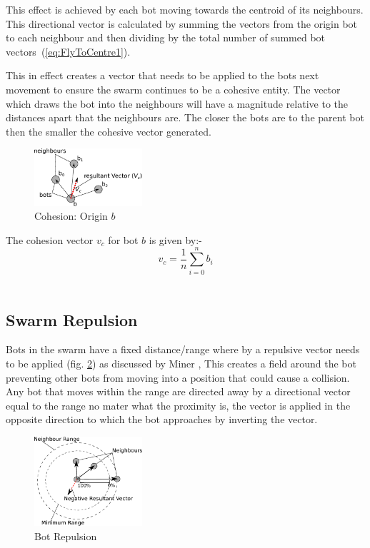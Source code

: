 \documentclass[10pt,journal,letterpaper,twoside]{IEEEtran}
\newcommand{\Fig}{fig.}
\begin{document}
This effect is achieved by each bot moving towards the centroid of its
neighbours. This directional vector is calculated by summing the
vectors from the origin bot to each neighbour and then dividing by the
total number of summed bot vectors~(\ref{eq:FlyToCentre1}).

This in effect creates a vector that needs to be applied to the bots
next movement to ensure the swarm continues to be a cohesive
entity. The vector which draws the bot into the neighbours will have a
magnitude relative to the distances apart that the neighbours are. The
closer the bots are to the parent bot then the smaller the cohesive
vector generated.

\begin{figure}[H]
\begin{center}
\includegraphics[width=4cm]{figures/FlyToCentre1}
\end{center}
\caption{Cohesion: Origin $b$ \label{methods:FlyToCentre1}}
\end{figure}

The cohesion vector $v_{c}$ for bot $b$ is given by:-
\begin{equation}\label{eq:FlyToCentre1}
v_{c} = \frac{1}{n}{ \sum_{i=0}^{n}} b_i
\end{equation}‎

\subsection{Swarm Repulsion}
Bots in the swarm have a fixed distance/range where by a repulsive
vector needs to be applied (\Fig{} \ref{methods:Repulsion1}) as
discussed by Miner \cite{MD07}, This creates a field around the bot
preventing other bots from moving into a position that could cause a
collision. Any bot that moves within the range are directed away by a
directional vector equal to the range no mater what the proximity is,
the vector is applied in the opposite direction to which the bot
approaches by inverting the vector.

\begin{figure}[H]
\begin{center}
\includegraphics[width=4cm]{figures/Repulsion1}
\caption{Bot Repulsion \label{methods:Repulsion1}}
\end{center}
\end{figure}
\end{document}
